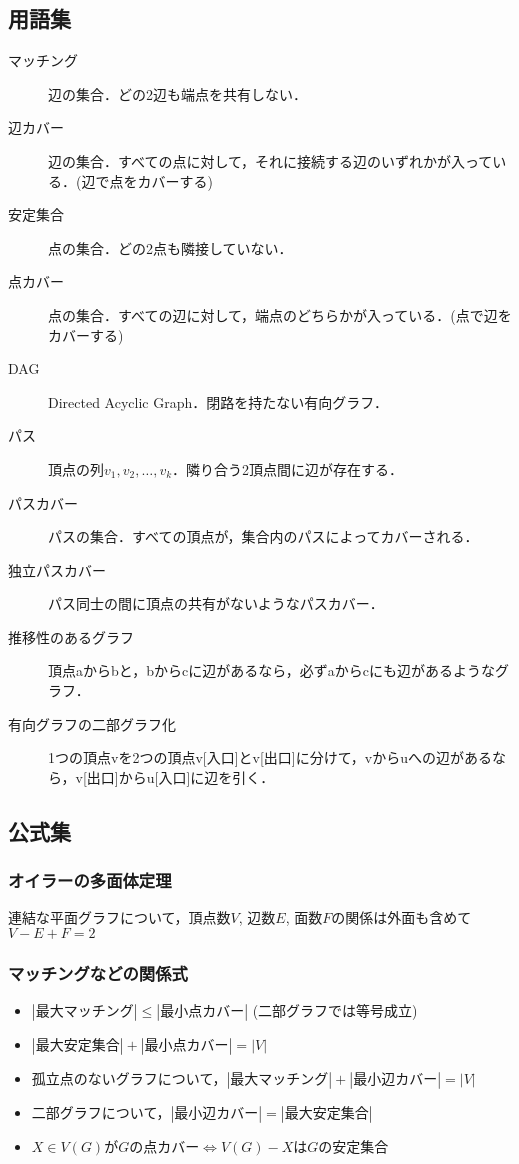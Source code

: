 \documentclass[landscape, twocolumn, 9pt]{jsarticle}
\begin{document}
\subsection{用語集}
\begin{description}
    \item[マッチング] 辺の集合．どの2辺も端点を共有しない．
    \item[辺カバー] 辺の集合．すべての点に対して，それに接続する辺のいずれかが入っている．(辺で点をカバーする)
    \item[安定集合] 点の集合．どの2点も隣接していない．
    \item[点カバー] 点の集合．すべての辺に対して，端点のどちらかが入っている．(点で辺をカバーする)
    \item[DAG] Directed Acyclic Graph．閉路を持たない有向グラフ．
    \item[パス] 頂点の列$v_1, v_2, \dots, v_k$．隣り合う2頂点間に辺が存在する．
    \item[パスカバー] パスの集合．すべての頂点が，集合内のパスによってカバーされる．
    \item[独立パスカバー] パス同士の間に頂点の共有がないようなパスカバー．
    \item[推移性のあるグラフ] 頂点aからbと，bからcに辺があるなら，必ずaからcにも辺があるようなグラフ．
    \item[有向グラフの二部グラフ化] 1つの頂点vを2つの頂点v[入口]とv[出口]に分けて，vからuへの辺があるなら，v[出口]からu[入口]に辺を引く．
\end{description}
\subsection{公式集}
\subsubsection{オイラーの多面体定理}
連結な平面グラフについて，頂点数$V$, 辺数$E$, 面数$F$の関係は外面も含めて$V - E + F = 2$
\subsubsection{マッチングなどの関係式} %
\begin{itemize}
    \item $|最大マッチング| \leq |最小点カバー|$ (二部グラフでは等号成立) 
    \item $|最大安定集合| + |最小点カバー| = |V|$
    \item 孤立点のないグラフについて，$|最大マッチング| + |最小辺カバー| = |V|$
    \item 二部グラフについて，$|最小辺カバー| = |最大安定集合|$
    \item $X \in V(G)がGの点カバー \iff V(G) - XはGの安定集合$
\end{itemize}
\end{document}
